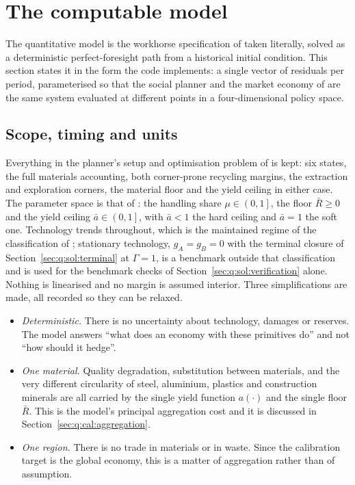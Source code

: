 \section{The computable model}\label{sec:q:model}

The quantitative model is the workhorse specification of  taken literally, solved as a deterministic perfect-foresight path from a historical initial condition. This section states it in the form the code implements: a single vector of residuals per period, parameterised so that the social planner and the market economy of \theorynote{} are the same system evaluated at different points in a four-dimensional policy space.

\subsection{Scope, timing and units}\label{sec:q:model:scope}

 Everything in the planner's setup and optimisation problem of \theorynote{} is kept: six states, the full materials accounting, both corner-prone recycling margins, the extraction and exploration corners, the material floor and the yield ceiling in either case. The parameter space is that of \theorynote{}: the handling share $\mu\in\left(0,1\right]$, the floor $\bar R\ge0$ and the yield ceiling $\bar a\in\left(0,1\right]$, with $\bar a<1$ the hard ceiling and $\bar a=1$ the soft one. Technology trends throughout, which is the maintained regime of the classification of ; stationary technology, $g_A=g_B=0$ with the terminal closure of Section~\ref{sec:q:sol:terminal} at $\Gamma=1$, is a benchmark outside that classification and is used for the benchmark checks of Section~\ref{sec:q:sol:verification} alone. Nothing is linearised and no margin is assumed interior. Three simplifications are made, all recorded so they can be relaxed.
\begin{itemize}
\item \emph{Deterministic.} There is no uncertainty about technology, damages or reserves. The model answers ``what does an economy with these primitives do'' and not ``how should it hedge''.
\item \emph{One material.} Quality degradation, substitution between materials, and the very different circularity of steel, aluminium, plastics and construction minerals are all carried by the single yield function $a\left(\cdot\right)$ and the single floor $\bar R$. This is the model's principal aggregation cost and it is discussed in Section~\ref{sec:q:cal:aggregation}.
\item \emph{One region.} There is no trade in materials or in waste. Since the calibration target is the global economy, this is a matter of aggregation rather than of assumption.
\end{itemize}

